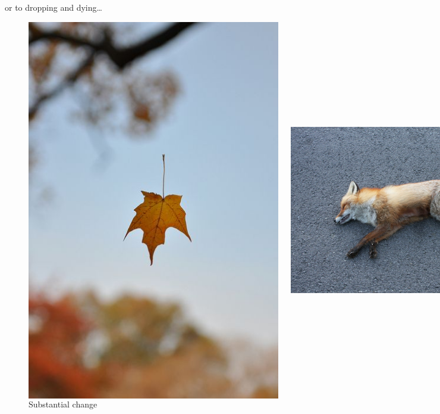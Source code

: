 \documentclass[xcolor=dvipsnames]{beamer}
\begin{document}
\begin{frame}{or to dropping and dying\ldots}
\begin{figure}
  \centering
  \begin{columns}
    \centering
    \caption {Change of location}
    \includegraphics[width=0.99\textwidth]{leaf}
    \centering
    \caption {Substantial change}
    \includegraphics[width=0.99\textwidth]{fox}
  \end{columns}
\end{figure}
\end{frame}
\end{document}

